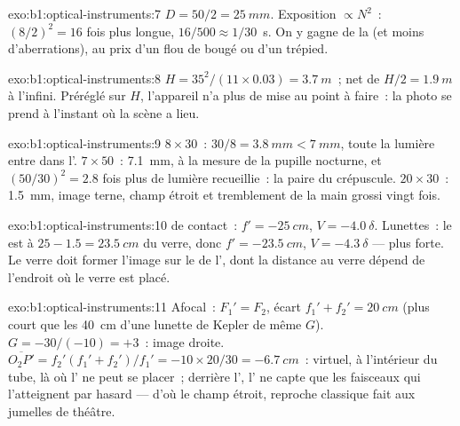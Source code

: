 \begin{solution}{exo:b1:optical-instruments:7}
$D = 50/2 = \qty{25}{mm}$. Exposition $\propto N^2$~: $(8/2)^2 = 16$ fois
plus longue, $16/500 \approx 1/30$~\unit{s}. On y gagne de la  (et moins d'aberrations), au prix d'un flou de bougé ou d'un trépied.
\end{solution}

\begin{solution}{exo:b1:optical-instruments:8}
$H = 35^2/(11 \times 0.03) = \qty{3.7}{m}$~; net de $H/2 =
\qty{1.9}{m}$ à l'infini. Préréglé sur $H$, l'appareil n'a plus de mise
au point à faire~: la photo se prend à l'instant où la scène a lieu.
\end{solution}

\begin{solution}{exo:b1:optical-instruments:9}
$8\times30$~:  $30/8 = \qty{3.8}{mm} < \qty{7}{mm}$, toute
la lumière entre dans l'. $7\times50$~: \qty{7.1}{mm}, à la mesure de
la pupille nocturne, et $(50/30)^2 = 2.8$ fois plus de lumière
recueillie~: la paire du crépuscule. $20\times30$~: 
\qty{1.5}{mm}, image terne, champ étroit et tremblement de la main
grossi vingt fois.
\end{solution}

\begin{solution}{exo:b1:optical-instruments:10}
 de contact~: $f' = \qty{-25}{cm}$, $V = \qty{-4.0}{\delta}$.
Lunettes~: le  est à $25 - 1.5 = \qty{23.5}{cm}$ du verre,
donc $f' =
\qty{-23.5}{cm}$, $V = \qty{-4.3}{\delta}$ --- plus forte. Le verre doit
former l'image sur le  de l', dont la distance au
verre dépend de l'endroit où le verre est placé.
\end{solution}

\begin{solution}{exo:b1:optical-instruments:11}
Afocal~: $F_1' = F_2$, écart $f_1' + f_2' = \qty{20}{cm}$ (plus court que
les \qty{40}{cm} d'une lunette de Kepler de même $G$). $G = -30/(-10) =
+3$~: image droite.  $\overline{O_2P'} = f_2'(f_1' + f_2')/f_1' =
-10 \times 20/30 = \qty{-6.7}{cm}$~: virtuel, à l'intérieur du tube, là
où l' ne peut se placer~; derrière l', l' ne capte que les
faisceaux qui l'atteignent par hasard --- d'où le champ étroit, reproche
classique fait aux jumelles de théâtre.
\end{solution}

